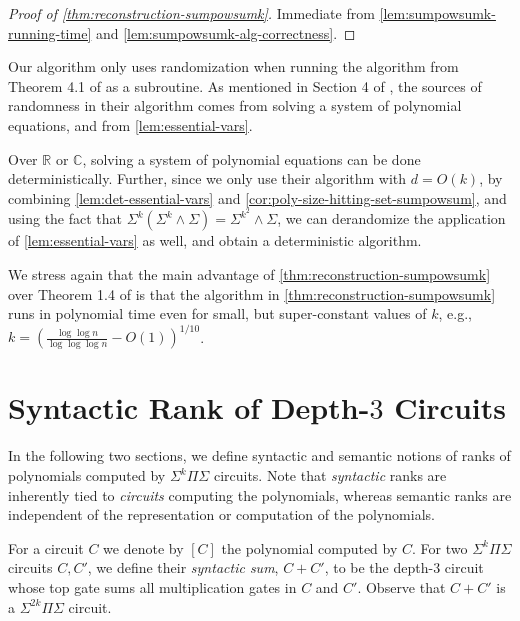 \documentclass[12pt]{article}
\renewcommand{\C}{\mathbb{C}}
\renewcommand{\R}{\mathbb{R}}
\newcommand{\SumBPowSum}[1]{\Sigma^{#1}\!\wedge\!\Sigma}
\newcommand{\SumPowSumk}{\Sigma^k \!\wedge\! \Sigma}
\newcommand{\SumProdSumk}{\Sigma^k \Pi \Sigma}
\newcommand{\Sps}[1]{\Sigma^{#1} \Pi\Sigma}
\begin{document}
	\begin{proof}[Proof of \autoref{thm:reconstruction-sumpowsumk}]
		Immediate from \autoref{lem:sumpowsumk-running-time} and \autoref{lem:sumpowsumk-alg-correctness}.
	\end{proof}
	
	\begin{remark}
		\label{rem:sumpowsumk-derandomization}
		Our algorithm only uses randomization when running the algorithm from Theorem 4.1 of \cite{BSV21} as a subroutine. As mentioned in Section 4 of \cite{BSV21}, the sources of randomness in their algorithm comes from solving a system of polynomial equations, and from \autoref{lem:essential-vars}.
		
		Over $\R$ or $\C$, solving a system of polynomial equations can be done deterministically. Further, since we only use their algorithm with $d=O(k)$, by combining \autoref{lem:det-essential-vars} and \autoref{cor:poly-size-hitting-set-sumpowsum}, and using the fact that $\Sigma^k (\SumPowSumk) = \SumBPowSum{k^2}$, we can derandomize the application of \autoref{lem:essential-vars} as well, and obtain a deterministic algorithm.
	\end{remark}
	
	We stress again that the main advantage of \autoref{thm:reconstruction-sumpowsumk} over Theorem 1.4 of \cite{BSV21} is that the algorithm in \autoref{thm:reconstruction-sumpowsumk}  runs in polynomial time even for small, but super-constant values of $k$, e.g., $k=\left(\frac{\log \log n}{\log \log \log n}-O(1)\right)^{1/10}$.
	
	
	\section{Syntactic Rank of Depth-$3$ Circuits}\label{sec:syn}
	
	In the following two sections, we define syntactic and semantic notions of ranks of polynomials computed by $\Sps{k}$ circuits. Note that \emph{syntactic} ranks are inherently tied to \emph{circuits} computing the polynomials, whereas semantic ranks are independent of the representation or computation of the polynomials.
	
	
	For a circuit $C$ we denote by $[C]$ the polynomial computed by $C$.
	For two $\SumProdSumk$ circuits $C, C'$, we define their \emph{syntactic sum}, $C + C'$, to be the depth-$3$ circuit whose top gate sums all multiplication gates in $C$ and $C'$. Observe that $C + C'$ is a $\Sps{2k}$ circuit.
	
\end{document}
